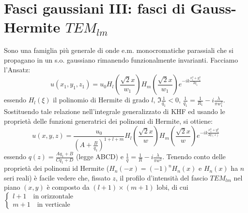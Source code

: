 \documentclass{book}
\def \l {\lambda}
\theoremstyle{remark}
\begin{document}
\section{Fasci gaussiani III: fasci di Gauss-Hermite $TEM_{lm}$}
Sono una famiglia più generale di onde e.m. monocromatiche parassiali che si propagano in un s.o. gaussiano rimanendo funzionalmente invarianti. Facciamo l'Ansatz:
\begin{equation*}
u(x_1,y_1,z_1) = u_0 H_l\left(\frac{\sqrt{2} x}{w_1}\right) H_m\left(\frac{\sqrt{2} x}{w_1}\right) e^{-ik\frac{x_1^2 + y_1^2}{2q_1}}
\end{equation*}
essendo $H_l(\xi)$ il polinomio di Hermite di grado $l$, $\Im{\frac{1}{q_1}} < 0$, $\frac{1}{q_1} = \frac{1}{R_1} - i\frac{\l}{\pi w_1^2}$.
Sostituendo tale relazione nell'integrale generalizzato di KHF ed usando le proprietà delle funzioni generatrici dei polinomi di Hermite, si ottiene:
\begin{equation*}
u(x,y,z) = \frac{u_0}{\left( A + \frac{B}{q_1}\right)^{1+l+m}} H_l\left(\frac{\sqrt{2} x}{w}\right) H_m\left(\frac{\sqrt{2} x}{w}\right) e^{-ik\frac{x_1^2 + y_1^2}{2q(z)}}
\end{equation*}
essendo $q(z) = \frac{Aq_1 + B}{Cq_1 + D}$ (legge ABCD) e $\frac{1}{q} = \frac{1}{R} -i \frac{\l}{\pi w^2}$.
Tenendo conto delle proprietà dei polinomi id Hermite ($H_n(-x) = (-1)^n H_n(x)$ e $H_n(x)$ ha $n$ seri reali) è facile vedere che, fissato $z$, il profilo d'intensità del fascio $TEM_{lm}$ nel piano $(x,y)$ è composto da $(l+1)\times(m+1)$ lobi, di cui
$\begin{cases}
l+1 \quad \text{in orizzontale}\\
m+1 \quad \text{in verticale}
\end{cases}$
\end{document}
